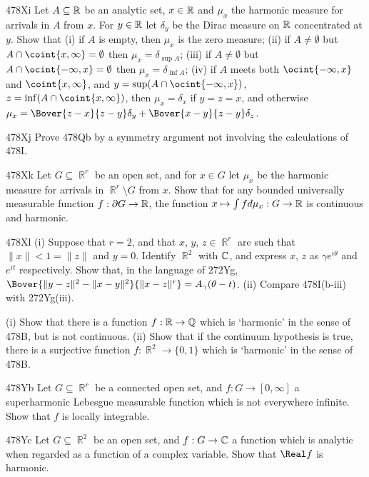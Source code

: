 {\spheader 478Xi Let $A\subseteq\Bbb R$ be an analytic set, $x\in\Bbb R$ and
$\mu_x$ the harmonic measure for arrivals in $A$ from $x$.   For
$y\in\Bbb R$ let $\delta_y$ be the Dirac measure on $\Bbb R$ concentrated
at $y$.   Show that (i) if $A$ is empty, then $\mu_x$ is the zero measure;
(ii) if $A\ne\emptyset$ but $A\cap\coint{x,\infty}=\emptyset$ then
$\mu_x=\delta_{\sup A}$;
(iii) if $A\ne\emptyset$ but $A\cap\ocint{-\infty,x}=\emptyset$ then
$\mu_x=\delta_{\inf A}$;  (iv) if $A$ meets both $\ocint{-\infty,x}$ and
$\coint{x,\infty}$, and $y=\sup(A\cap\ocint{-\infty,x})$,
$z=\inf(A\cap\coint{x,\infty})$, then $\mu_x=\delta_x$ if $y=z=x$, and
otherwise $\mu_x=\Bover{z-x}{z-y}\delta_y+\Bover{x-y}{z-y}\delta_z$.

\spheader 478Xj Prove 478Qb by a symmetry argument not involving the
calculations of 478I.

\sqheader 478Xk Let $G\subseteq\BbbR^r$ be an open set, and for $x\in G$
let $\mu_x$ be the
harmonic measure for arrivals in $\BbbR^r\setminus G$ from $x$.
Show that for any bounded universally measurable function
$f:\partial G\to\Bbb R$, the function
$x\mapsto\int fd\mu_x:G\to\Bbb R$ is continuous and harmonic.

\spheader 478Xl (i)
Suppose that $r=2$, and that $x$, $y$, $z\in\BbbR^r$ are
such that $\|x\|<1=\|z\|$ and $y=0$.   Identify $\BbbR^2$ with $\Bbb C$,
and express $x$, $z$ as $\gamma e^{i\theta}$ and $e^{it}$ respectively.
Show that, in the language of 272Yg,
$\Bover{\|y-z\|^2-\|x-y\|^2}{\|x-z\|^r}=A_{\gamma}(\theta-t)$.
(ii) Compare 478I(b-iii) with 272Yg(iii).

%
(i) Show that there is a function $f:\Bbb R\to\Bbb Q$ which
is `harmonic' in the sense of 478B, but is not continuous.      (ii) Show that if the continuum hypothesis is true, there is a
surjective
function $f:\BbbR^2\to\{0,1\}$ which is `harmonic' in the sense of 478B.

\spheader 478Yb Let $G\subseteq\BbbR^r$ be a connected open set, and
$f:G\to[0,\infty]$ a superharmonic Lebesgue measurable function which is
not everywhere infinite.   Show that $f$ is locally integrable.

\spheader 478Yc Let $G\subseteq\BbbR^2$ be an open set, and $f:G\to\Bbb C$ a
function which is analytic when regarded as a function of a complex
variable.   Show that $\Real f$ is harmonic.   

}
